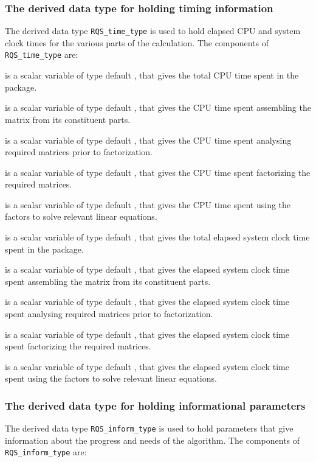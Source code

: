 \documentclass{galahad}
\newcommand{\packagename}{RQS}
\begin{document}
\subsubsection{The derived data type for holding timing
 information}\label{typetime}
The derived data type
{\tt \packagename\_time\_type}
is used to hold elapsed CPU and system clock times for the various parts of
the calculation. The components of
{\tt \packagename\_time\_type}
are:
\begin{description}
 is a scalar variable of type default \realdp, that gives
 the total CPU time spent in the package.

 is a scalar variable of type default \realdp, that gives
 the CPU time spent assembling the matrix  from its constituent parts.

 is a scalar variable of type default \realdp, that gives
 the CPU time spent analysing required matrices prior to factorization.

 is a scalar variable of type default \realdp, that gives
 the CPU time spent factorizing the required matrices.

 is a scalar variable of type default \realdp, that gives
 the CPU time spent using the factors to solve relevant linear equations.

 is a scalar variable of type default \realdp, that gives
 the total elapsed system clock time spent in the package.

 is a scalar variable of type default \realdp, that gives
 the elapsed system clock time spent assembling the matrix  from
its constituent parts.

 is a scalar variable of type default \realdp, that gives
 the elapsed system clock time spent analysing required matrices prior to
factorization.

 is a scalar variable of type default \realdp, that gives
 the elapsed system clock time spent factorizing the required matrices.

 is a scalar variable of type default \realdp, that gives
 the elapsed system clock time spent using the factors to solve relevant
linear equations.

\end{description}


\subsubsection{The derived data type for holding informational
 parameters}\label{typeinform}
The derived data type
{\tt \packagename\_inform\_type}
is used to hold parameters that give information about the progress and needs
of the algorithm. The components of
{\tt \packagename\_inform\_type}
are:
\end{document}
